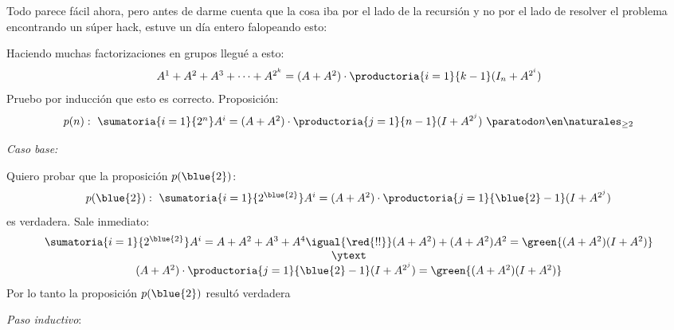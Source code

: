 {\tiny
Todo parece fácil ahora, pero antes de darme cuenta que la cosa iba por el lado de la recursión y no por el lado de resolver el problema
encontrando un súper hack,  estuve un día entero falopeando esto:

Haciendo muchas factorizaciones en grupos llegué a esto:
$$
  \textstyle
  A^1 + A^2 + A^3 + \cdots + A^{2^k} = (A + A^2) \cdot \productoria{i = 1}{k-1} (I_n + A^{2^i})
$$
Pruebo por inducción que esto es correcto. Proposición:
$$
  \textstyle
  p(n) : ~ \sumatoria{i=1}{2^n} A^i = (A + A^2) \cdot \productoria{j=1}{n-1}(I + A^{2^j}) ~ \paratodo n \en \naturales_{\geq 2}
$$

\medskip

\textit{Caso base:}

Quiero probar que la proposición $p(\blue{2})$:
$$
  \textstyle
  p(\blue{2}) : ~ \sumatoria{i = 1}{2^{\blue{2}}} A^i = (A + A^2) \cdot \productoria{j = 1}{\blue{2}-1}(I + A^{2^j})
$$
es verdadera. Sale inmediato:
$$
  \textstyle
  \begin{array}{c}
    \sumatoria{i = 1}{2^{\blue{2}}} A^i = A + A^2 + A^3 + A^4
    \igual{\red{!!}}
    (A + A^2) + (A + A^2)A^2 =
    \green{(A + A^2)(I + A^2)} \\
    \ytext                     \\
    (A + A^2) \cdot \productoria{j = 1}{\blue{2}-1}(I + A^{2^j}) =
    \green{(A + A^2)(I + A^2)} \\
  \end{array}
$$
Por lo tanto la proposición $p(\blue{2})$ resultó verdadera

\medskip

\textit{Paso inductivo}:

}
